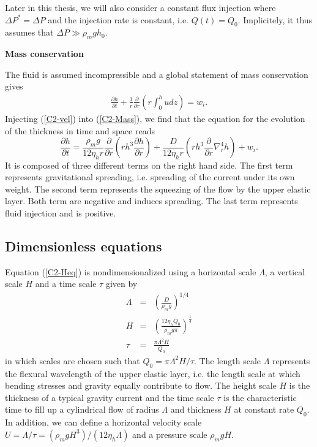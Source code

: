 Later in this thesis, we will  also consider a constant flux injection
where  $\Delta  P^*=\Delta P$  and  the  injection rate  is  constant,
i.e.     $Q(t)=Q_0$.    Implicitely,     it    thus     assumes    that
$\Delta P \gg \rho_m g h_0$.

\vspace{.5cm} \textbf{Mass conservation} \vspace{.5cm}

The fluid  is assumed  incompressible and a  global statement  of mass
conservation gives
\begin{eqnarray}
  \frac{\partial         h}{\partial        t} +\frac{1}{r}
  \frac{\partial}{\partial
  r} \left( r\int_0^hudz\right) = w_i.
  \label{C2-Mass}
\end{eqnarray}
Injecting  (\ref{C2-vel})  into  (\ref{C2-Mass}),  we  find  that  the
equation for the evolution of the thickness in time and space reads
\begin{equation}
  \frac{\partial h}{\partial t} =\frac{\rho_mg}{12 \eta_h r}
  \frac{\partial}{\partial r}  \left( rh^3  \frac{\partial h}{\partial
      r}\right)+\frac{D}{12\eta_h r} \left( rh^3 \frac{\partial}{\partial r}\nabla_r^4h\right)+
  w_i .\label{C2-Heq}
\end{equation}
It is  composed of three different  terms on the right  hand side. The
first term represents gravitational  spreading, i.e.  spreading of the
current under its own weight. The second term represents the squeezing
of the  flow by the upper  elastic layer.  Both term  are negative and
induces spreading.   The last term  represents fluid injection  and is
positive.

\subsection{Dimensionless equations}
\label{C2-sec:dimens-equat}

Equation (\ref{C2-Heq}) is nondimensionalized using a horizontal scale
$\Lambda$, a vertical scale $H$ and a time scale $\tau$ given by
\begin{eqnarray}
  \Lambda &=& \left(\frac{D}{\rho_m g}\right)^{1/4}\label{C2-L1}\\
  H&=&\left       (\frac{12\eta_h      Q_{0}}{\rho_{m}g       \pi}\right      )
       ^{\frac{1}{4}} \label{C2-H1}\\
  \tau&=&\frac{\pi \Lambda^{2} H}{Q_{0}}\label{C2-T1}
\end{eqnarray}
in which scales are chosen such  that $Q_0 = \pi\Lambda^2 H/\tau$. The
length scale $\Lambda$ represents the  flexural wavelength of the upper
elastic layer,  i.e. the  length scale at  which bending  stresses and
gravity  equally contribute  to flow.   The  height scale  $H$ is  the
thickness of  a typical gravity current  and the time scale  $\tau$ is
the  characteristic time  to  fill  up a  cylindrical  flow of  radius
$\Lambda$ and thickness  $H$ at constant rate $Q_0$.   In addition, we
can       define        a       horizontal        velocity       scale
$U=\Lambda/\tau=\left(\rho_m           g           H^3\right)/\left(12
  \eta_h\Lambda\right)$ and a pressure scale $\rho_m g H$.

